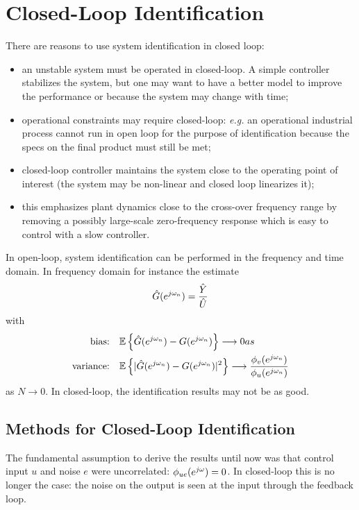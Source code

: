 \chapter{Closed-Loop Identification}
\label{chap:closed-loop-identification}


There are reasons to use system identification in closed loop:
\begin{itemize}
\item an unstable system must be operated in closed-loop. A simple controller stabilizes the system, but one may want to have a better model to improve the performance or because the system may change with time;
\item operational constraints may require closed-loop: \textit{e.g.} an operational industrial process cannot run in open loop for the purpose of identification because the specs on the final product must still be met;
\item closed-loop controller maintains the system close to the operating point of interest (the system may be non-linear and closed loop linearizes it);
\item this emphasizes plant dynamics close to the cross-over frequency range by removing a possibly large-scale zero-frequency response which is easy to control with a slow controller.
\end{itemize}
In open-loop, system identification can be performed in the frequency and time domain. In frequency domain for instance the estimate
\begin{equation*}
  \hat{G}(e^{j\omega_n}) = \frac{\hat{Y}}{\hat{U}}
\end{equation*}
with
\begin{align*}
  \textrm{bias:}\hspace{1em} & \mathbb{E}\left\{\hat{G}(e^{j\omega_n}) - G(e^{j\omega_n})\right\} \longrightarrow 0 as  \\
  \textrm{variance:}\hspace{1em} & \mathbb{E}\left\{|\hat{G}(e^{j\omega_n}) - G(e^{j\omega_n})|^2\right\} \longrightarrow \frac{\phi_v(e^{j\omega_n})}{\phi_u(e^{j\omega_n})}
\end{align*}
as $N\rightarrow 0$. In closed-loop, the identification results may not be as good.

\section{Methods for Closed-Loop Identification}
\label{sec:methods-closed-loop}


The fundamental assumption to derive the results until now was that control input $u$ and noise $e$ were uncorrelated: $\phi_{ue}(e^{j\omega}) = 0$. In closed-loop this is no longer the case: the noise on the output is seen at the input through the feedback loop.


